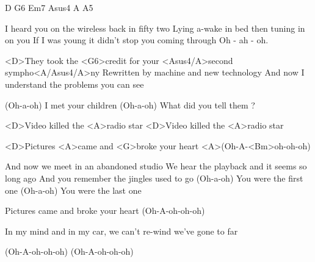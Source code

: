 

\zs
D                 G6    Em7          Asus4            A      A5

I heard you on     the wireless back   in fifty two
Lying      a-wake  in bed then  tuning in on    you
If I was     young it didn't   stop you coming  through
Oh - ah - oh.
\ks

\zs
<D>They took the <G6>credit for your <Asus4/A>second sympho<A/Asus4/A>ny
Rewritten     by machine and  new technology
And now I understand the problems you can see
\ks

(Oh-a-oh) I met your children
(Oh-a-oh) What did you tell them ?

\zr
<D>Video killed the <A>radio star
<D>Video killed the <A>radio star
\kr

<D>Pictures <A>came and <G>broke your heart
<A>(Oh-A-<Bm>oh-oh-oh)

\zs
And now we meet in an abandoned studio
We hear the playback and it seems so long ago
And you remember the jingles used to go
\ks
(Oh-a-oh) You were the first one
(Oh-a-oh) You were the last one

\zr \kr

Pictures came and broke your heart
(Oh-A-oh-oh-oh)

In my    mind and   in my car, we
can't re-wind we've gone to far

(Oh-A-oh-oh-oh)
(Oh-A-oh-oh-oh)

\kp
